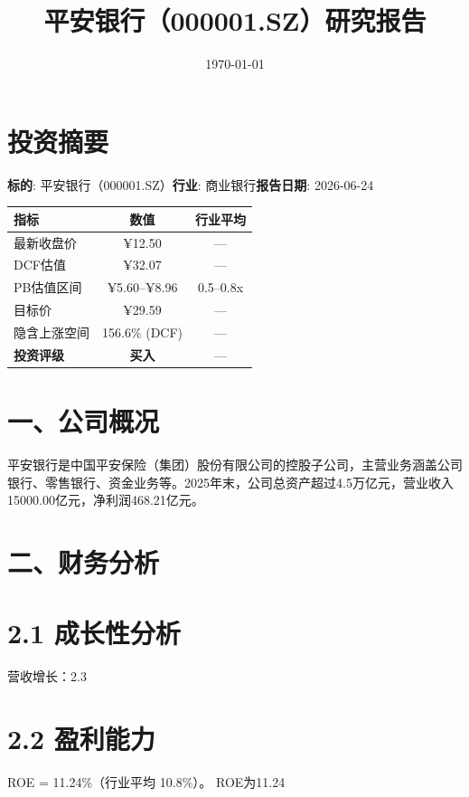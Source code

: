 \documentclass[12pt,a4paper]{article}
\begin{document}
\title{平安银行（000001.SZ）研究报告}
\date{\today}
\maketitle
\begin{abstract}

\end{abstract}
\newpage
\section{投资摘要}
\textbf{标的}: 平安银行（000001.SZ）\hspace{1em}\textbf{行业}: 商业银行\hspace{1em}\textbf{报告日期}: 2026-06-24

\begin{tabular}{@{}lcc@{}}\hline
\textbf{指标} & \textbf{数值} & \textbf{行业平均} \\ \hline
最新收盘价 & ¥12.50 & — \\
DCF估值 & ¥32.07 & — \\
PB估值区间 & ¥5.60--¥8.96 & 0.5--0.8x \\
目标价 & ¥29.59 & — \\
隐含上涨空间 & 156.6\% (DCF) & — \\
\textbf{投资评级} & \textbf{买入} & — \\ \hline
\end{tabular}

\section{一、公司概况}
平安银行是中国平安保险（集团）股份有限公司的控股子公司，主营业务涵盖公司银行、零售银行、资金业务等。2025年末，公司总资产超过4.5万亿元，营业收入15000.00亿元，净利润468.21亿元。

\section{二、财务分析}


\section{2.1 成长性分析}
营收增长：2.3%

\section{2.2 盈利能力}
ROE = 11.24\%（行业平均 10.8\%）。 ROE为11.24%
\end{document}
